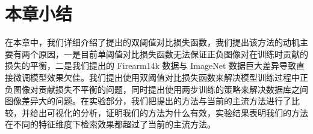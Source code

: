 \section{本章小结}\label{sec:double_margin_conclusion}
在本章中，我们详细介绍了提出的双阈值对比损失函数，我们提出该方法的动机主要有两个原因，一是目前单阈值对比损失函数无法保证正负图像对在训练时贡献的损失的平衡，二是我们提出的 Firearm14k 数据与 ImageNet 数据巨大差异导致直接微调模型效果欠佳。我们提出使用双阈值对比损失函数来解决模型训练过程中正负图像对贡献损失不平衡的问题，同时提出使用两步训练的策略来解决数据库之间图像差异大的问题。在实验部分，我们把提出的方法与当前的主流方法进行了比较，并给出可视化的分析，证明我们的方法为什么有效，实验结果表明我们的方法在不同的特征维度下检索效果都超过了当前的主流方法。
